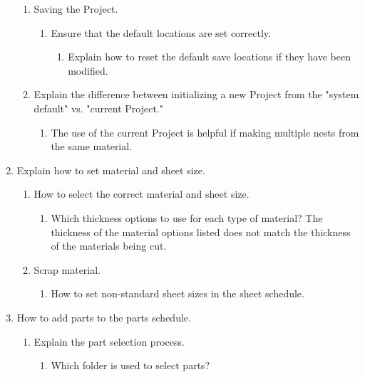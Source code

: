 \documentclass[11pt, a4paper, oneside]{report}
\begin{document}
\begin{enumerate}
\begin{enumerate}
            \item Saving the Project.
                \begin{enumerate}
                    \item Ensure that the default locations are set correctly.
                        \begin{enumerate}
                            \item Explain how to reset the default save locations if they have been modified.
                        \end{enumerate}
                \end{enumerate}
            \item Explain the difference between initializing a new Project from the "system default" vs. "current Project."
                \begin{enumerate}
                    \item The use of the current Project is helpful if making multiple nests from the same material.
                \end{enumerate}
        \end{enumerate}
    \item Explain how to set material and sheet size.
        \begin{enumerate}
            \item How to select the correct material and sheet size.
                \begin{enumerate}
                    \item Which thickness options to use for each type of material? The thickness of the material options listed does not match the thickness of the materials being cut.
                \end{enumerate}
            \item Scrap material.
                \begin{enumerate}
                    \item How to set non-standard sheet sizes in the sheet schedule.
                \end{enumerate}
        \end{enumerate}
    \item How to add parts to the parts schedule.
        \begin{enumerate}
            \item Explain the part selection process.
                \begin{enumerate}
                    \item Which folder is used to select parts?

\end{enumerate}
\end{enumerate}
\end{enumerate}
\end{document}
